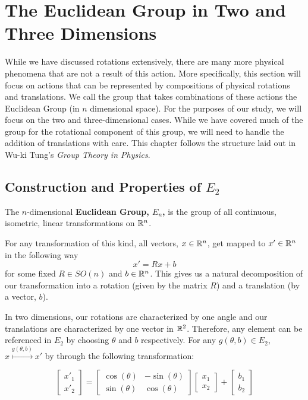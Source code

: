 \chapter{The Euclidean Group in Two and Three Dimensions}\label{En}

While we have discussed rotations extensively, there are many more physical phenomena that are not a result of this action. More specifically, this section will focus on actions that can be represented by compositions of physical rotations and translations. We call the group that takes combinations of these actions the Euclidean Group (in $n$ dimensional space). For the purposes of our study, we will focus on the two and three-dimensional cases. While we have covered much of the group for the rotational component of this group, we will need to handle the addition of translations with care. This chapter follows the structure laid out in Wu-ki Tung's \textit{Group Theory in Physics}. \cite{Tung}

\section{Construction and Properties of $E_2$}

\begin{definition}
	The $n$-dimensional \textbf{Euclidean Group, $E_n$,} is the group of all continuous, isometric, linear transformations on $\mathbb{R}^n$.
\end{definition}

For any transformation of this kind, all vectors, $x\in\mathbb{R}^n$, get mapped to $x'\in\mathbb{R}^n$ in the following way 
$$x' = Rx + b$$
for some fixed $R\in SO(n)$ and $b\in\mathbb{R}^n$. This gives us a natural decomposition of our transformation into a rotation (given by the matrix $R$) and a translation (by a vector, $b$).

In two dimensions, our rotations are characterized by one angle and our translations are characterized by one vector in $\mathbb{R}^2$. Therefore, any element can be referenced in $E_2$ by choosing $\theta$ and $b$ respectively. For any $g(\theta,b)\in E_2$, $x\overset{g(\theta,b)}{\mapsto}x'$ by through the following transformation:

$$\begin{bmatrix}x'_1\\x'_2\end{bmatrix} = \begin{bmatrix}
			\cos(\theta) & -\sin(\theta) \\
			\sin(\theta) & \cos(\theta) 
		\end{bmatrix} \begin{bmatrix}x_1\\x_2\end{bmatrix} + \begin{bmatrix}b_1\\b_2\end{bmatrix} $$

